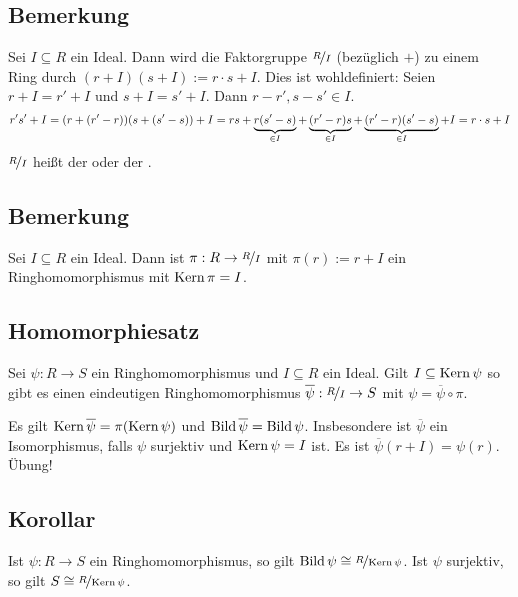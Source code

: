 \subsection[Bemerkung: Die Faktorgruppe $\nicefrac{R}{I}$ ist ein Faktorring]{Bemerkung} %
\label{sub:63}
Sei $I \subseteq R$ ein Ideal. Dann wird die Faktorgruppe $\nicefrac{R}{I}$ (bezüglich $+$) zu einem Ring durch $(r+I)(s+I) := r \cdot s + I$. Dies ist wohldefiniert:
Seien $r+I = r' +I$ und $s+I = s' +I$. Dann $r-r', s-s' \in I$. 
\[
	r' s' +I = (r+(r'-r)) (s+(s'-s))+I = r s + \underbrace{r(s'-s)}_{\in I}+ \underbrace{(r'-r)s  }_{\in I} + \underbrace{(r'-r)(s'-s)}_{\in I}+I 
	= r \cdot s +I
\]
$\nicefrac{R}{I}$ heißt der  oder der .

\subsection[Bemerkung: Die Quotientenabbildung ist ein Ringhomomorphismus]{Bemerkung} %
\label{sub:64}
Sei $I \subseteq R$ ein Ideal. Dann ist $\pi : R \to \nicefrac{R}{I}$ mit $\pi(r) := r + I$ ein Ringhomomorphismus mit $\operatorname{Kern} \pi = I$.

\subsection{Homomorphiesatz} %
\label{sub:65}
\begin{wrapfigure}[5]{R}{1cm}
\end{wrapfigure}
Sei $\psi : R \to S$ ein Ringhomomorphismus und $I \subseteq R$ ein Ideal. Gilt $I \subseteq \operatorname{Kern} \psi$ so gibt es einen eindeutigen Ringhomomorphismus
$\overline{\psi} : \nicefrac{R}{I} \to S $ mit $\psi = \overline{\psi} \circ \pi  $.

Es gilt $\operatorname{Kern} \overline{\psi} = \pi ( \operatorname{Kern} \psi) $ und $\operatorname{Bild} \overline{\psi} = \operatorname{Bild} \psi $. Insbesondere ist $\overline{\psi} $ ein Isomorphismus, falls $\psi$ surjektiv
und $\operatorname{Kern} \psi = I$ ist. Es ist $ \overline{\psi}(r+ I) = \psi(r)$.
Übung!

\subsection[Korollar aus dem Homomorphiesatz]{Korollar} %
\label{sub:66}
Ist $\psi : R \to S$ ein Ringhomomorphismus, so gilt $\operatorname{Bild} \psi \cong \nicefrac{R}{\operatorname{Kern} \psi}$. Ist $\psi$ surjektiv, so gilt $S \cong \nicefrac{R}{\operatorname{Kern} \psi}$.

